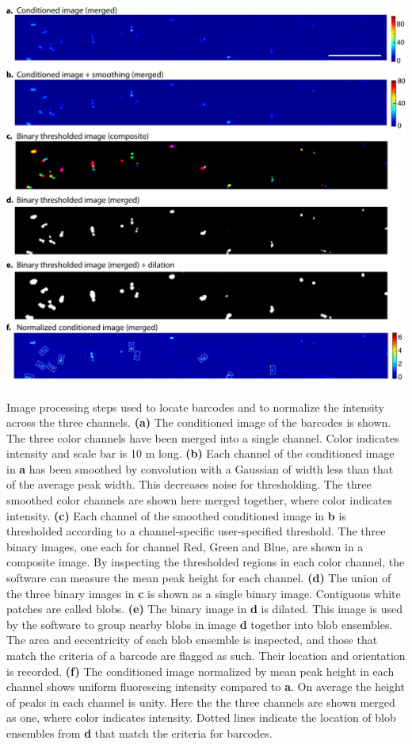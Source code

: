 \begin{FPfigure}
	\includegraphics[width=\textwidth]{figures/theoryBlobRelated}
	\caption{Image processing steps used to locate barcodes and to normalize the intensity across the three channels. 
	\textbf{(a)} The conditioned image of the barcodes is shown. The three color channels have been merged into a single channel. Color indicates intensity and scale bar is 10 \textmu m long. 
	\textbf{(b)} Each channel of the conditioned image in \textbf{a} has been  smoothed by convolution with a Gaussian of width less than that of the average peak width. This decreases noise for thresholding. The three smoothed color channels are shown here merged together, where color indicates intensity. 
	\textbf{(c)} Each channel of the smoothed conditioned image in \textbf{b} is thresholded according to a channel-specific user-specified threshold. The three binary images, one each for channel Red, Green and Blue,  are shown in a composite image.  By inspecting the thresholded regions in each color channel, the software can measure the mean peak height for each channel. 
	\textbf{(d)} The union of the three binary images in \textbf{c} is shown as a single binary image. Contiguous white patches are called blobs.
	\textbf{(e)} The binary image in \textbf{d} is dilated. This image is used by the software to group nearby blobs in image \textbf{d} together into blob ensembles.  The area and eccentricity of each blob ensemble is inspected, and those that match the criteria of a barcode are flagged as such. Their location and orientation is recorded. 
	\textbf{(f)} The conditioned image normalized by mean peak height in each channel shows uniform fluorescing intensity compared to \textbf{a}. On average the height of peaks in each channel is unity. Here the the three channels are shown merged as one, where color indicates intensity.
	Dotted lines indicate the location of blob ensembles from \textbf{d} that match the criteria for barcodes.\label{fig:blobs}}
\end{FPfigure}


